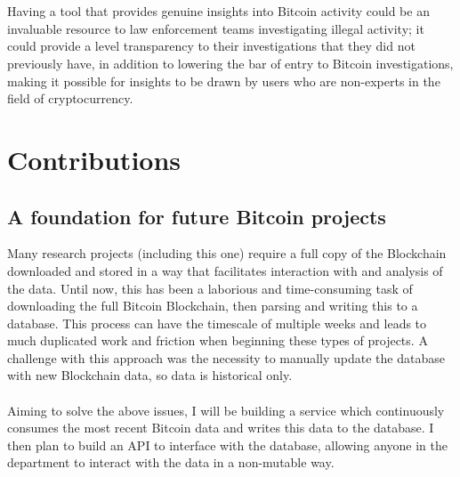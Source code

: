 \\\\
Having a tool that provides genuine insights into Bitcoin activity could be an invaluable resource to law enforcement teams investigating illegal activity; it could provide a level transparency to their investigations that they did not previously have, in addition to lowering the bar of entry to Bitcoin investigations, making it possible for insights to be drawn by users who are non-experts in the field of cryptocurrency. 


\section{Contributions}


\subsection{A foundation for future Bitcoin projects}
Many research projects (including this one) require a full copy of the Blockchain downloaded and stored in a way that facilitates interaction with and analysis of the data. Until now, this has been a laborious and time-consuming task of downloading the full Bitcoin Blockchain, then parsing and writing this to a database. This process can have the timescale of multiple weeks and leads to much duplicated work and friction when beginning these types of projects. A challenge with this approach was the necessity to manually update the database with new Blockchain data, so data is historical only.
\\\\
Aiming to solve the above issues, I will be building a service which continuously consumes the most recent Bitcoin data and writes this data to the database. I then plan to build an API to interface with the database, allowing anyone in the department to interact with the data in a non-mutable way. 
           
 
